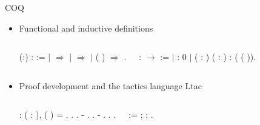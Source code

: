 \documentclass[t]{beamer}
\begin{document}
\begin{frame}{COQ}
	\begin{itemize}
		\item Functional and inductive definitions
		\begin{columns}
			\scriptsize
			\begin{coqdoccode}
				\coqdocnoindent
				  (:) :  :=\coqdoceol
				\coqdocindent{1.00em}
				  \coqdoceol
				\coqdocindent{2.00em}
				\ensuremath{|}  \ensuremath{\Rightarrow} \coqdoceol
				\coqdocindent{2.00em}
				\ensuremath{|}   \ensuremath{\Rightarrow} \coqdoceol
				\coqdocindent{2.00em}
				\ensuremath{|} \coqdocvar{S} ( ) \ensuremath{\Rightarrow}  \coqdoceol
				\coqdocindent{1.00em}
				.\coqdoceol
			\end{coqdoccode}
			\column{0.5\textwidth}
			\begin{coqdoccode}
				\coqdocnoindent
				  :  \ensuremath{\rightarrow}  :=\coqdoceol
				\coqdocindent{1.00em}
				\ensuremath{|}  :  0\coqdoceol
				\coqdocindent{1.00em}
				\ensuremath{|}  ( : ) ( :  ) :  (\coqdocvar{S} ( )).\coqdoceol
			\end{coqdoccode}
		\end{columns}

		\item Proof development and the tactics language Ltac
		\begin{columns}[T]
			\scriptsize
			\begin{coqdoccode}
				\coqdocemptyline
				\coqdocnoindent
				  : \coqdockw{\ensuremath{\forall}} ( : ),\coqdoceol
				\coqdocindent{1.00em}
				\coqdocvar{negb} ( \coqdocvar{b}) = .\coqdoceol
				\coqdocnoindent
				.\coqdoceol
				\coqdocindent{1.00em}
				 .\coqdoceol
				\coqdocindent{1.00em}
				- . .\coqdoceol
				\coqdocindent{1.00em}
				- . .\coqdoceol
				\coqdocnoindent
				.\coqdoceol
			\end{coqdoccode}
			\column{0.5\textwidth}
			\begin{coqdoccode}
				   :=\coqdoceol
				\coqdocindent{1.00em}
				 ; ; .\coqdoceol
			\end{coqdoccode}
		\end{columns}
	\end{itemize}
\end{frame}
\end{document}
